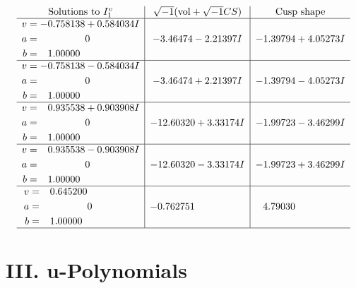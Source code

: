 \documentclass[1p]{elsarticle_modified}
\theoremstyle{definition}
\newcommand{\I}{\sqrt{-1}}
\begin{document}
$$\begin{array}{c|c|c}  
\text{Solutions to }I^v_{1}& \I (\text{vol} + \sqrt{-1}CS) & \text{Cusp shape}\\
 \hline 
\begin{aligned}
v &= -0.758138 + 0.584034 I \\
a &= \phantom{-0.000000 } 0 \\
b &= \phantom{-}1.00000\phantom{ +0.000000I}\end{aligned}
 & -3.46474 - 2.21397 I & -1.39794 + 4.05273 I \\ \hline\begin{aligned}
v &= -0.758138 - 0.584034 I \\
a &= \phantom{-0.000000 } 0 \\
b &= \phantom{-}1.00000\phantom{ +0.000000I}\end{aligned}
 & -3.46474 + 2.21397 I & -1.39794 - 4.05273 I \\ \hline\begin{aligned}
v &= \phantom{-}0.935538 + 0.903908 I \\
a &= \phantom{-0.000000 } 0 \\
b &= \phantom{-}1.00000\phantom{ +0.000000I}\end{aligned}
 & -12.60320 + 3.33174 I & -1.99723 - 3.46299 I \\ \hline\begin{aligned}
v &= \phantom{-}0.935538 - 0.903908 I \\
a &= \phantom{-0.000000 } 0 \\
b &= \phantom{-}1.00000\phantom{ +0.000000I}\end{aligned}
 & -12.60320 - 3.33174 I & -1.99723 + 3.46299 I \\ \hline\begin{aligned}
v &= \phantom{-}0.645200\phantom{ +0.000000I} \\
a &= \phantom{-0.000000 } 0 \\
b &= \phantom{-}1.00000\phantom{ +0.000000I}\end{aligned}
 & -0.762751\phantom{ +0.000000I} & \phantom{-}4.79030\phantom{ +0.000000I}\\
 \hline 
 \end{array}$$\newpage
\newpage\renewcommand{\arraystretch}{1}
\centering \section*{ III. u-Polynomials}
\end{document}
